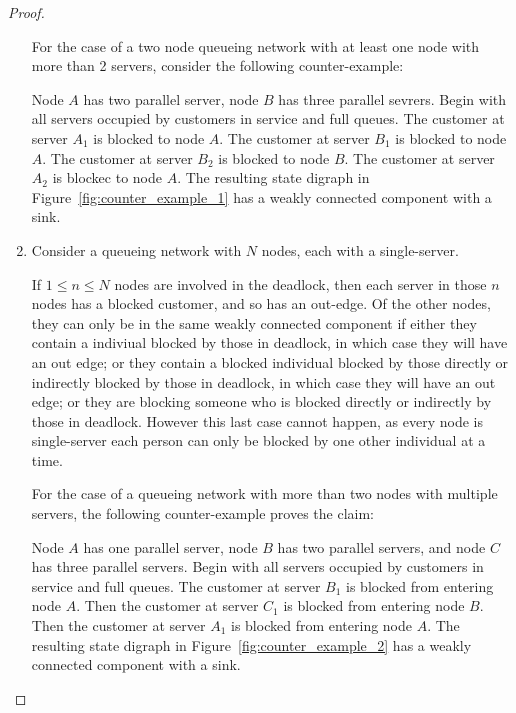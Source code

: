 \documentclass{article}
\begin{document}
\begin{proof}
\begin{enumerate}
For the case of a two node queueing network with at least one node with more than 2 servers, consider the following counter-example:

Node $A$ has two parallel server, node $B$ has three parallel sevrers.
Begin with all servers occupied by customers in service and full queues.
The customer at server $A_1$ is blocked to node $A$.
The customer at server $B_1$ is blocked to node $A$.
The customer at server $B_2$ is blocked to node $B$.
The customer at server $A_2$ is blockec to node $A$.
The resulting state digraph in Figure~\ref{fig:counter_example_1} has a weakly connected component with a sink.

\item
Consider a queueing network with $N$ nodes, each with a single-server.

If $1 \leq n \leq N$ nodes are involved in the deadlock, then each server in those $n$ nodes has a blocked customer, and so has an out-edge.
Of the other nodes, they can only be in the same weakly connected component if either they contain a indiviual blocked by those in deadlock, in which case they will have an out edge; or they contain a blocked individual blocked by those directly or indirectly blocked by those in deadlock, in which case they will have an out edge; or they are blocking someone who is blocked directly or indirectly by those in deadlock.
However this last case cannot happen, as every node is single-server each person can only be blocked by one other individual at a time.

For the case of a queueing network with more than two nodes with multiple servers, the following counter-example proves the claim:

Node $A$ has one parallel server, node $B$ has two parallel servers, and node $C$ has three parallel servers.
Begin with all servers occupied by customers in service and full queues.
The customer at server $B_1$ is blocked from entering node $A$.
Then the customer at server $C_1$ is blocked from entering node $B$.
Then the customer at server $A_1$ is blocked from entering node $A$.
The resulting state digraph in Figure~\ref{fig:counter_example_2} has a weakly connected component with a sink.
\end{enumerate}
\end{proof}
\end{document}
